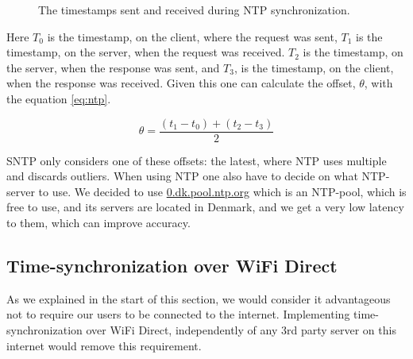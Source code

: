 \begin{figure}[htb]
    \centering
    \caption{The timestamps sent and received during \ac{NTP} synchronization.}
    \label{fig:ntp_packets}
\end{figure}

Here $T_0$ is the timestamp, on the client, where the request was sent, $T_1$ is the timestamp, on the server, when the request was received.
$T_2$ is the timestamp, on the server, when the response was sent, and $T_3$, is the timestamp, on the client, when the response was received.
Given this one can calculate the offset, $\theta$, with the equation \ref{eq:ntp}.

\begin{equation}\label{eq:ntp}
    \theta = \frac{(t_1 - t_0)+(t_2 - t_3)}{2}
\end{equation}

\ac{SNTP} only considers one of these offsets: the latest, where \ac{NTP} uses multiple and discards outliers.
When using \ac{NTP} one also have to decide on what \ac{NTP}-server to use.
We decided to use \url{0.dk.pool.ntp.org} which is an \ac{NTP}-pool, which is free to use, and its servers are located in Denmark, and we get a very low latency to them, which can improve accuracy.

\subsection{Time-synchronization over WiFi Direct}
As we explained in the start of this section, we would consider it advantageous not to require our users to be connected to the internet.
Implementing time-synchronization over WiFi Direct, independently of any 3rd party server on this internet would remove this requirement.

